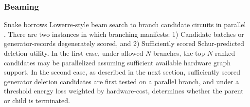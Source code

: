 \documentclass[
  reprint,
  amsmath,
  amssymb,
  aps,
  pra,
  nofootinbib,
  superscriptaddress,
  floatfix
]{revtex4-2}
\begin{document}
\subsubsection{Beaming}
Snake borrows Lowerre-style beam search to branch candidate circuits in parallel \cite{Lowerre1976Beam}.
There are two instances in which branching manifests: 1) Candidate batches or generator-records degenerately scored, and 2) Sufficiently scored Schur-predicted deletion utility. In the first case, under allowed $N$ branches, the top $N$ ranked candidates may be parallelized assuming sufficient available hardware graph support. In the second case, as described in the next section, sufficiently scored generator deletion candidates are first tested on a parallel branch, and under a threshold energy loss weighted by hardware-cost, determines whether the parent or child is terminated.
\end{document}
